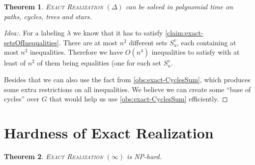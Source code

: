 \documentclass[11pt,a4paper]{article}
\newtheorem{theorem}{Theorem}
\theoremstyle{remark}
\theoremstyle{definition}
\newcommand{\NP}{\textrm{NP}}
\begin{document}
\begin{theorem}
	\textsc{Exact Realization $(\Delta)$} can be solved in polynomial time on paths, cycles, trees and stars.
\end{theorem}

\begin{proof}[Idea:]
    For a labeling $\lambda$ we know that it has to satisfy \cref{claim:exact-setsOfInequalities}.
    There are at most $n^2$ different sets $S_u^v$, each containing at most $n^2$ inequalities. 
    Therefore we have $O(n^4)$ inequalities to satisfy with at least of $n^2$ of them being equalities (one for each set $S_u^v$. 
    
    Besides that we can also use the fact from \cref{obs:exact-CyclesSum}, which produces some extra restrictions on all inequalities.
    We believe we can create some ``base of cycles'' over $G$ that would help us use \cref{obs:exact-CyclesSum} efficiently.
\end{proof}
    
\section{Hardness of Exact Realization}


\begin{theorem}
	\textsc{Exact Realization $(\infty)$} is \NP-hard.
\end{theorem}
\end{document}
